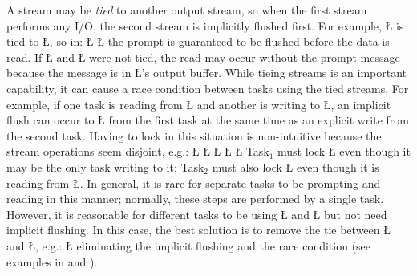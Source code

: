 \documentclass[openright,twoside]{report}
\begin{document}
 A stream may be \emph{tied} to another output stream, so when the first stream performs any I/O, the second stream is implicitly flushed first.
For example, \LGinlinetrue\LGbegin\lgrinde\L{}\endlgrinde\LGend{} is tied to \LGinlinetrue\LGbegin\lgrinde\L{}\endlgrinde\LGend{}, so in:
\LGinlinefalse\LGbegin\lgrinde
\L{}
\CE{}\L{}
\CE{}\endlgrinde\LGend
the prompt is guaranteed to be flushed before the data is read.
If \LGinlinetrue\LGbegin\lgrinde\L{}\endlgrinde\LGend{} and \LGinlinetrue\LGbegin\lgrinde\L{}\endlgrinde\LGend{} were not tied, the read may occur without the prompt message because the message is in \LGinlinetrue\LGbegin\lgrinde\L{}\endlgrinde\LGend{}'s output buffer.
While tieing streams is an important capability, it can cause a race condition between tasks using the tied streams.
For example, if one task is reading from \LGinlinetrue\LGbegin\lgrinde\L{}\endlgrinde\LGend{} and another is writing to \LGinlinetrue\LGbegin\lgrinde\L{}\endlgrinde\LGend{}, an implicit flush can occur to \LGinlinetrue\LGbegin\lgrinde\L{}\endlgrinde\LGend{} from the first task at the same time as an explicit write from the second task.
Having to lock in this situation is non-intuitive because the stream operations seem disjoint, e.g.:
\LGinlinefalse\LGbegin\lgrinde
\L{\LB{}}
\L{\LB{}}
\L{}
\CE{}\L{\LB{}}
\L{\LB{}}
\endlgrinde\LGend
Task$_1$ must lock \LGinlinetrue\LGbegin\lgrinde\L{}\endlgrinde\LGend{} even though it may be the only task writing to it;
Task$_2$ must also lock \LGinlinetrue\LGbegin\lgrinde\L{}\endlgrinde\LGend{} even though it is reading from \LGinlinetrue\LGbegin\lgrinde\L{}\endlgrinde\LGend{}.
In general, it is rare for separate tasks to be prompting and reading in this manner;
normally, these steps are performed by a single task.
However, it is reasonable for different tasks to be using \LGinlinetrue\LGbegin\lgrinde\L{}\endlgrinde\LGend{} and \LGinlinetrue\LGbegin\lgrinde\L{}\endlgrinde\LGend{} but not need implicit flushing.
In this case, the best solution is to remove the tie between \LGinlinetrue\LGbegin\lgrinde\L{}\endlgrinde\LGend{} and \LGinlinetrue\LGbegin\lgrinde\L{}\endlgrinde\LGend{}, e.g.:
\LGinlinefalse\LGbegin\lgrinde
\L{}
\CE{}\endlgrinde\LGend
eliminating the implicit flushing and the race condition (see examples in  and ).
\end{document}
